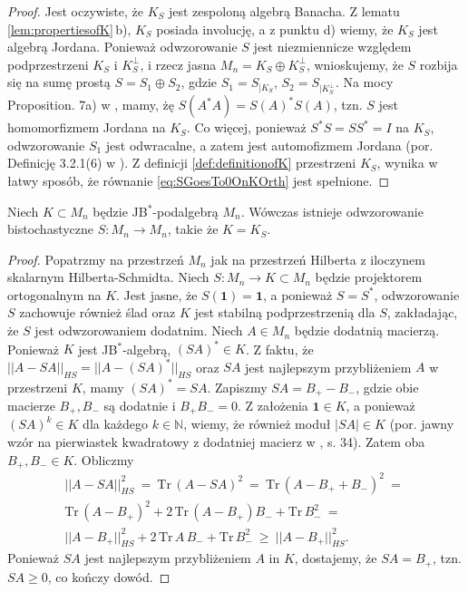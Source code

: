 \begin{proof}
Jest oczywiste, że $K_{S}$ jest zespoloną algebrą Banacha.
Z lematu \ref{lem:propertiesofK}\,b),
$K_{S}$ posiada involucję,
a z punktu d) wiemy, że $K_{S}$ jest algebrą Jordana.
Ponieważ odwzorowanie $S$ jest niezmiennicze względem podprzestrzeni
$K_{S}$ i $K_{S}^{\perp}$,
i rzecz jasna $M_{n} = K_{S} \oplus K_{S}^{\perp}$,
wnioskujemy, że $S$ rozbija się na sumę prostą
$S = S_{1} \oplus S_{2}$,
gdzie $S_{1} = S_{| K_{S}}$, $S_{2} = S_{| K_{S}^{\perp}}$.
Na mocy Proposition. 7a) w \cite{olkiewicz1999environment},
mamy, żę $S(A^{*} A) = S(A)^{*} S(A)$,
tzn. $S$ jest homomorfizmem Jordana na $K_{S}$.
Co więcej, ponieważ $S^{*} S = S S^{*} = I$ na $K_{S}$,
odwzorowanie $S_{1}$ jest odwracalne,
a zatem jest automofizmem Jordana
(por. Definicję 3.2.1(6) w \cite{Bratteli2003}).
Z definicji \eqref{def:definitionofK} przestrzeni $K_{S}$,
wynika w łatwy sposób, że
równanie \eqref{eq:SGoesTo0OnKOrth} jest spełnione.
\end{proof}

\begin{Theorem}
\label{thm:FromESbook}
Niech $K \subset M_{n}$ będzie JB$^{*}$-podalgebrą $M_{n}$.
Wówczas istnieje odwzorowanie bistochastyczne
$S \! : M_{n} \rightarrow M_{n}$, takie że $K = K_{S}$.
\end{Theorem}
\begin{proof}
Popatrzmy na przestrzeń $M_{n}$ jak na przestrzeń Hilberta z iloczynem skalarnym
Hilberta-Schmidta.
Niech $S\!: M_{n} \rightarrow K \subset M_{n}$ będzie
projektorem ortogonalnym na $K$.
Jest jasne, że $S(\mathbf{1}) = \mathbf{1}$,
a ponieważ $S = S^{*}$,
odwzorowanie $S$ zachowuje również ślad oraz
$K$ jest stabilną podprzestrzenią dla $S$,
zakładając, że $S$ jest odwzorowaniem dodatnim.
Niech $A \in M_{n}$  będzie dodatnią macierzą.
Ponieważ $K$ jest JB$^{*}$-algebrą,
$(SA)^{*} \in K$.
Z faktu, że
$|| A - SA ||_{HS} = || A - (SA)^{*} ||_{HS}$
oraz $SA$ jest najlepszym przybliżeniem $A$ w przestrzeni $K$,
mamy $(SA)^{*} = SA$.
Zapiszmy $SA = B_{+} - B_{-}$,
gdzie obie macierze $B_{+}, B_{-}$ są dodatnie i
$B_{+} B_{-} = 0$.
Z założenia $\mathbf{1} \in K$,
a ponieważ $(SA)^{k} \in K$ dla każdego $k \in \mathbb{N}$,
wiemy, że również moduł $|S A| \in K$
(por. jawny wzór na pierwiastek kwadratowy z dodatniej macierz w
\cite{Bratteli2003}, s. 34).
Zatem oba $B_{+}, B_{-} \in K$.
Obliczmy
\begin{multline}
|| A - SA ||_{HS}^{2} \: = \: \text{Tr} \, ( A - SA )^{2} \: = \:
    \text{Tr} \, ( A - B_{+} + B_{-} )^{2} \: = \: \\
    \text{Tr} \, ( A - B_{+} )^{2} +
        2 \, \text{Tr} \, ( A - B_{+} ) B_{-} + \text{Tr} \, B_{-}^{2}
            \: = \: \\
    || A - B_{+} ||_{HS}^{2} +
        2 \, \text{Tr} \,  A \, B_{-}+ \text{Tr} \, B_{-}^{2}
    \: \geq \: || A - B_{+} ||_{HS}^{2}.
\end{multline}
Ponieważ $SA$ jest najlepszym przybliżeniem $A$ in $K$,
dostajemy, że $SA = B_{+}$, tzn. $SA \geq 0$, co kończy dowód.
\end{proof}


